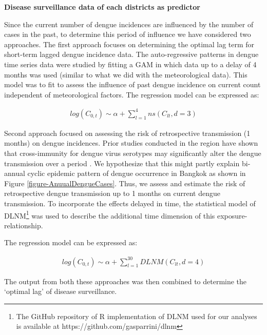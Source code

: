 \documentclass{bmcart}
\begin{document}
\textbf{Disease surveillance data of each districts as predictor}

Since the current number of dengue incidences are influenced by the number of cases in the past, to determine this period of influence we have considered two approaches. The first approach focuses on determining the optimal lag term for short-term lagged dengue incidence data. The auto-regressive patterns in dengue time series data were studied by fitting a GAM in which data up to a delay of 4 months was used (similar to what we did with the meteorological data). This model was to fit to assess the influence of past dengue incidence on current count independent of meteorological factors. The regression model can be expressed as:

\begin{equation}
\begin{aligned}
\label{eq:short}
log (C_{0,t}) \sim \alpha + \sum_{l=1}^{4} ns(C_ {lt}, d =3) 
\end{aligned}
\end{equation}

Second approach focused on assessing the risk of retrospective transmission (1 months) on dengue incidences. Prior studies conducted in the region have shown that cross-immunity for dengue virus serotypes may significantly alter the dengue transmission over a period \cite{adams2006cross,reich2013interactions}. We hypothesize that this might partly explain bi-annual cyclic epidemic pattern of dengue occurrence in Bangkok as shown in Figure \ref{figure-AnuualDengueCases}. Thus, we assess and estimate the risk of retrospective dengue transmission up to 1 months on current dengue transmission. To incorporate the effects delayed in time, the statistical model of DLNM\footnote{The GitHub repository of R implementation of DLNM used for our analyses is available at https://github.com/gasparrini/dlnm} was used to describe the additional time dimension of this exposure-relationship\cite{gasparrini2010distributed}. 

The regression model can be expressed as:

\begin{equation}
\begin{aligned}
\label{eq:long}
log (C_{0,t}) \sim \alpha + \sum_{l=1}^{30} DLNM(C_ {lt}, d = 4) 
\end{aligned}
\end{equation}


The output from both these approaches was then combined to determine the `optimal lag' of disease surveillance. 
\end{document}
